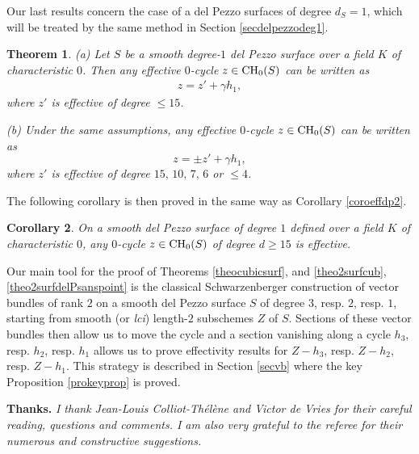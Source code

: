 \documentclass[10pt]{article}
\newtheorem{theo}{Theorem}[section]
\newtheorem{coro}[theo]{Corollary}
\begin{document}
Our last results concern the case of a del Pezzo surfaces of degree $d_S=1$, which will be treated by the same method in Section \ref{secdelpezzodeg1}.

\begin{theo} \label{theo2surfdelPezzodeg1}  (a)  Let   $S$ be a  smooth degree-$1$ del Pezzo surface over  a field $K$ of characteristic $0$. Then  any  effective $0$-cycle $z\in{\rm CH}_0(S)$ can be written as
 \begin{eqnarray}\label{eqformcycledp1} z=  z'+\gamma h_1,
 \end{eqnarray}
 where $z'$ is effective of degree $\leq 15$.

 (b) Under the same assumptions, any  effective $0$-cycle $z\in{\rm CH}_0(S)$ can be written as
 $$z= \pm z'+\gamma h_1,$$
 where $z'$ is effective of degree $15,\,10,\,7,\,6$ or $\leq 4$.
 \end{theo}

The following corollary is then proved in the same way as Corollary \ref{coroeffdp2}.

 \begin{coro} \label{coroeffdp1}  On a smooth del Pezzo surface of degree $1$ defined over a field $K$ of characteristic $0$, any $0$-cycle $z\in {\rm CH}_0(S)$ of degree $d\geq  15$ is effective.
 \end{coro}


 Our main tool for the proof of Theorems  \ref{theocubicsurf}, and \ref{theo2surfcub}, \ref{theo2surfdelPsanspoint} is the classical  Schwarzenberger  construction of vector bundles of rank $2$ on a smooth del Pezzo surface $S$ of degree $3$, resp. $2$, resp. $1$, starting from smooth (or {\it lci}) length-$2$ subschemes $Z$ of $S$. Sections of these vector bundles then allow us to move the cycle and a section vanishing along a cycle $h_3$, resp. $h_2$, resp. $h_1$ allows us to prove effectivity results for $Z-h_3$, resp. $Z-h_2$, resp. $Z-h_1$. This strategy is described in Section \ref{secvb} where the key Proposition \ref{prokeyprop} is proved.

 \vspace{0.5cm}

 {\bf Thanks.} {\it I thank Jean-Louis Colliot-Th\'{e}l\`{e}ne and Victor de Vries for their careful reading, questions and comments. I am also very grateful to the referee for their numerous and constructive suggestions.}
\end{document}
